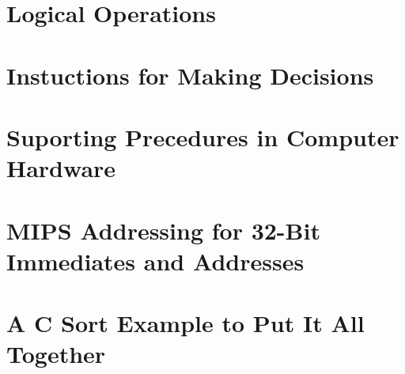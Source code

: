 \section{Logical Operations}
\section{Instuctions for Making Decisions}
\section{Suporting Precedures in Computer Hardware}
\section{MIPS Addressing for 32-Bit Immediates and Addresses}
\section{A C Sort Example to Put It All Together}
